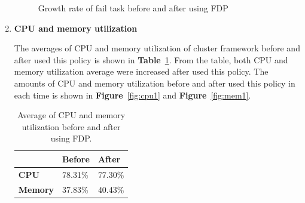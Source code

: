 \documentclass[12pt,oneside,openright,a4paper]{cpe-english-project}
\begin{document}
\begin{enumerate}
\begin{figure}[!h]\centering
    \setlength{\fboxrule}{0mm} %
    \setlength{\fboxsep}{0cm}
    \caption{Growth rate of fail task before and after using FDP}\label{fig:fail1}
\end{figure}

\newpage
  \item \textbf{CPU and memory utilization}

\hspace{10mm}The averages of CPU and memory utilization of cluster framework before and after used this policy is shown in \textbf{Table}~\ref{tbl:po1CPUMem}. From the table, both CPU and memory utilization average were increased after used this policy. The amounts of CPU and memory utilization before and after used this policy in each time is shown in \textbf{Figure}~\ref{fig:cpu1} and \textbf{Figure}~\ref{fig:mem1}. 
  
  \begin{table}[!h]
  \caption{Average of CPU and memory utilization before and after using FDP.}\label{tbl:po1CPUMem}
  \begin{tabular}{@{}|p{}|p{}|p{}|}
   \hline
   \textbf{} & \textbf{Before} & \textbf{After} \\ 
   \hline
   \textbf{CPU} & 78.31\% & 77.30\% \\ 
   \hline
   \textbf{Memory} & 37.83\% & 40.43\% \\ 
   \hline                     
  \end{tabular}
\end{table}


\end{enumerate}
\end{document}
